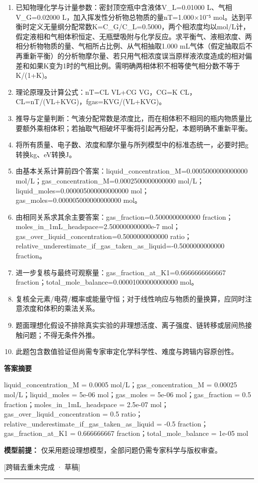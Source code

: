 \documentclass[UTF8,11pt,a4paper]{ctexart}
\begin{document}
\begin{enumerate}
\item 已知物理化学与计量参数：密封顶空瓶中含液体V\_L=0.01000 L、气相V\_G=0.02000 L，加入挥发性分析物总物质的量nT=1.000×10⁻⁵ mol。达到平衡时定义无量纲分配常数K=C\_G/C\_L=0.5000，两个相浓度均以mol/L计，假定液相和气相体积恒定、无瓶壁吸附与化学反应。求平衡气、液相浓度、两相分析物物质的量、气相所占比例、从气相抽取1.000 mL气体（假定抽取后不再重新平衡）的分析物摩尔量、若只用气相浓度误当原样液浓度造成的相对偏差和如果K变为1时的气相比例。需明确两相体积不相等使气相分数不等于K/(1+K)。
\item 理论原理及计算公式：nT=CL VL+CG VG，CG=K CL，CL=nT/(VL+KVG)，fgas=KVG/(VL+KVG)。
\item 推导与定量判断：气液分配常数是浓度比，而在相体积不相同的瓶内物质量比要额外乘相体积；若抽取气相破坏平衡将引起再分配，本题明确不重新平衡。
\item 将所有质量、电子数、浓度和摩尔量与所列模型中的标准态统一，必要时把g转换kg、eV转换J。
\item 由基本关系计算前四个答案：liquid\_concentration\_M=0.0005000000000000 mol/L；gas\_concentration\_M=0.0002500000000000 mol/L；liquid\_moles=0.000005000000000000 mol；gas\_moles=0.000005000000000000 mol。
\item 由相同关系求其余主要答案：gas\_fraction=0.5000000000000 fraction；moles\_in\_1mL\_headspace=2.500000000000e-7 mol；gas\_over\_liquid\_concentration=0.5000000000000 ratio；relative\_underestimate\_if\_gas\_taken\_as\_liquid=-0.5000000000000 fraction。
\item 进一步复核与最终可观察量：gas\_fraction\_at\_K1=0.6666666666667 fraction；total\_mole\_balance=0.00001000000000000 mol。
\item 复核全元素/电荷/概率或能量守恒；对于线性响应与物质的量换算，应同时注意浓度和体积的乘法关系。
\item 题面理想化假设不排除真实实验的非理想活度、离子强度、链转移或层间热接触问题；不得无条件外推。
\item 此题包含数值验证但尚需专家审定化学科学性、难度与跨辑内容原创性。
\end{enumerate}
\noindent\textbf{答案摘要}\par
liquid\_concentration\_M = 0.0005 mol/L；gas\_concentration\_M = 0.00025 mol/L；liquid\_moles = 5e-06 mol；gas\_moles = 5e-06 mol；gas\_fraction = 0.5 fraction；moles\_in\_1mL\_headspace = 2.5e-07 mol；gas\_over\_liquid\_concentration = 0.5 ratio；relative\_underestimate\_if\_gas\_taken\_as\_liquid = -0.5 fraction；gas\_fraction\_at\_K1 = 0.666666667 fraction；total\_mole\_balance = 1e-05 mol\par
\noindent\textbf{模型前提：}
仅采用题设理想模型，全部问题仍需专家科学与版权审查。\par
\noindent\textcolor{red!65!black}{[跨辑去重未完成 · 草稿]} \par
\medskip\hrule\medskip
{}
\end{document}
